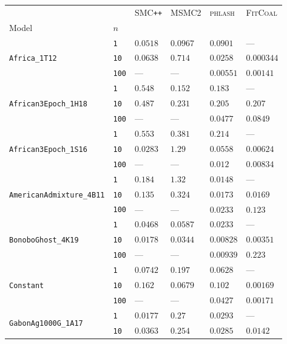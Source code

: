 \documentclass{article}
\begin{document}
\begin{footnotesize}
\begin{tabular}{llllll}
\toprule
 &  & \textsc{SMC}\texttt{{++}} & \textsc{MSMC2} & \textsc{phlash} & \textsc{FitCoal} \\
Model & $n$ &  &  &  &  \\
\midrule
\multirow[c]{3}{*}{\texttt{Africa\_1T12}} & \texttt{1} & $0.0518$ & $0.0967$ & $0.0901$ & --- \\
 & \texttt{10} & $0.0638$ & $0.714$ & $0.0258$ & $0.000344$ \\
 & \texttt{100} & --- & --- & $0.00551$ & $0.00141$ \\
\cline{1-6}
\multirow[c]{3}{*}{\texttt{African3Epoch\_1H18}} & \texttt{1} & $0.548$ & $0.152$ & $0.183$ & --- \\
 & \texttt{10} & $0.487$ & $0.231$ & $0.205$ & $0.207$ \\
 & \texttt{100} & --- & --- & $0.0477$ & $0.0849$ \\
\cline{1-6}
\multirow[c]{3}{*}{\texttt{African3Epoch\_1S16}} & \texttt{1} & $0.553$ & $0.381$ & $0.214$ & --- \\
 & \texttt{10} & $0.0283$ & $1.29$ & $0.0558$ & $0.00624$ \\
 & \texttt{100} & --- & --- & $0.012$ & $0.00834$ \\
\cline{1-6}
\multirow[c]{3}{*}{\texttt{AmericanAdmixture\_4B11}} & \texttt{1} & $0.184$ & $1.32$ & $0.0148$ & --- \\
 & \texttt{10} & $0.135$ & $0.324$ & $0.0173$ & $0.0169$ \\
 & \texttt{100} & --- & --- & $0.0233$ & $0.123$ \\
\cline{1-6}
\multirow[c]{3}{*}{\texttt{BonoboGhost\_4K19}} & \texttt{1} & $0.0468$ & $0.0587$ & $0.0233$ & --- \\
 & \texttt{10} & $0.0178$ & $0.0344$ & $0.00828$ & $0.00351$ \\
 & \texttt{100} & --- & --- & $0.00939$ & $0.223$ \\
\cline{1-6}
\multirow[c]{3}{*}{\texttt{Constant}} & \texttt{1} & $0.0742$ & $0.197$ & $0.0628$ & --- \\
 & \texttt{10} & $0.162$ & $0.0679$ & $0.102$ & $0.00169$ \\
 & \texttt{100} & --- & --- & $0.0427$ & $0.00171$ \\
\cline{1-6}
\multirow[c]{3}{*}{\texttt{GabonAg1000G\_1A17}} & \texttt{1} & $0.0177$ & $0.27$ & $0.0293$ & --- \\
 & \texttt{10} & $0.0363$ & $0.254$ & $0.0285$ & $0.0142$ \\

\end{tabular}
\end{footnotesize}
\end{document}
